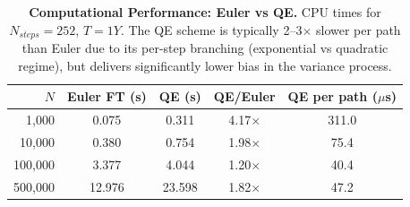 \begin{table}[h!]
\centering
\begin{tabular}{rcccc}
\toprule
$N$ & Euler FT (s) & QE (s) & QE/Euler & QE per path ($\mu$s) \\
\midrule
1,000 & 0.075 & 0.311 & 4.17$\times$ & 311.0 \\
10,000 & 0.380 & 0.754 & 1.98$\times$ & 75.4 \\
100,000 & 3.377 & 4.044 & 1.20$\times$ & 40.4 \\
500,000 & 12.976 & 23.598 & 1.82$\times$ & 47.2 \\
\bottomrule
\end{tabular}
\caption{\textbf{Computational Performance: Euler vs QE.}
CPU times for $N_{steps}=252$, $T=1Y$. The QE scheme is typically
2--3$\times$ slower per path than Euler due to its per-step
branching (exponential vs quadratic regime), but delivers significantly
lower bias in the variance process.}
\label{tab:cpu_performance}
\end{table}